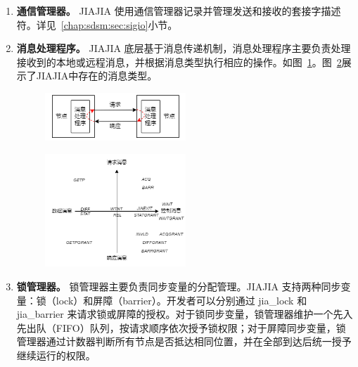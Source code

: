 {\begin{enumerate}[label=\arabic*.]
        \item \textbf{通信管理器。} JIAJIA 使用通信管理器记录并管理发送和接收的套接字描述符。详见~\ref{chap:sdsm:sec:sigio}小节。

        \item \textbf{消息处理程序。} JIAJIA 底层基于消息传递机制，消息处理程序主要负责处理接收到的本地或远程消息，并根据消息类型执行相应的操作。如图~\ref{fig:JIAJIA-message-handle}。图~\ref{fig:JIAJIA-message-types}展示了JIAJIA中存在的消息类型。
              \begin{figure}[!htbp]
                  \centering
                  \includegraphics[width=0.50\textwidth]{Img/message-handler.png}
                  \label{fig:JIAJIA-message-handle}
              \end{figure}

              \begin{figure}[!htbp]
                  \centering
                  \includegraphics[width=0.50\textwidth]{Img/message-types.png}
                  \label{fig:JIAJIA-message-types}
              \end{figure}

        \item \textbf{锁管理器。} 锁管理器主要负责同步变量的分配管理。JIAJIA 支持两种同步变量：锁（lock）和屏障（barrier）。开发者可以分别通过 jia\_lock 和 jia\_barrier 来请求锁或屏障的授权。对于锁同步变量，锁管理器维护一个先入先出队（FIFO）队列，按请求顺序依次授予锁权限；对于屏障同步变量，锁管理器通过计数器判断所有节点是否抵达相同位置，并在全部到达后统一授予继续运行的权限。
    \end{enumerate}

}
